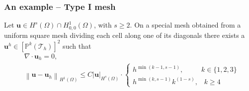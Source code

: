 \documentclass{beamer}
\let\vec\mathbf
\newcommand{\norm}[1]{\left\lVert#1\right\rVert}
\newcommand{\abs}[1]{\left|#1\right|}
\begin{document}
	\begin{frame}
		\frametitle{An example -- Type I mesh}
		\begin{lemma}
			Let $\vec{u} \in H^s(\Omega)\cap H^{1}_{0,0}(\Omega)$, with $s\geq 2$. On a special mesh obtained from a uniform square mesh dividing each cell along one of its diagonals there exists a $\vec{u}^h \in [\mathbb{P}^k(\mathcal{T}_h) ]^2$ such that
			\begin{align*}
				&\nabla\cdot \vec{u}_h = 0, \\
				&\norm{\vec{u}-\vec{u}_h}_{H^1(\Omega)} \leq C\abs{\vec{u}}_{H^s(\Omega)}\cdot \begin{cases}
					h^{\min(k-1,s-1)},\;\;\qquad k\in \{1,2,3\}\\
					h^{\min(k,s-1)}k^{(1-s)},\;\;\; k \geq 4
				\end{cases}
			\end{align*}
		\end{lemma}
	\end{frame}
\end{document}
